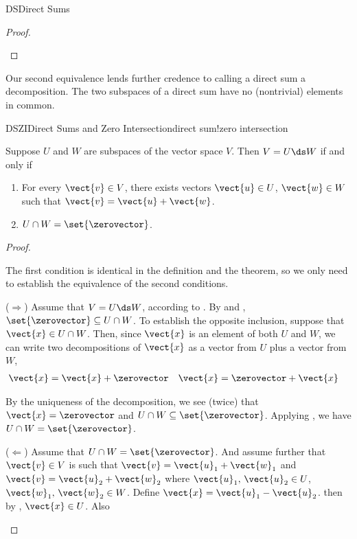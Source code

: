 \begin{subsect}{DS}{Direct Sums}
\begin{proof}
\begin{para}
\end{para}
%
\end{proof}
%
\begin{para}Our second equivalence lends further credence to calling a direct sum a decomposition.  The two subspaces of a direct sum have no (nontrivial) elements in common.\end{para}
%
\begin{theorem}{DSZI}{Direct Sums and Zero Intersection}{direct sum!zero intersection}
\begin{para}Suppose $U$ and $W$ are subspaces of the vector space $V$.  Then $V=U\ds W$ if and only if
\begin{enumerate}
\item  For every $\vect{v}\in V$, there exists vectors $\vect{u}\in U$, $\vect{w}\in W$ such that $\vect{v}=\vect{u}+\vect{w}$.
%
\item $U\cap W=\set{\zerovector}$.
\end{enumerate}
\end{para}
\end{theorem}
%
\begin{proof}
\begin{para}The first condition is identical in the definition and the theorem, so we only need to establish the equivalence of the second conditions.\end{para}
%
\begin{para}($\Rightarrow$)
Assume that $V=U\ds W$, according to .   By  and , $\set{\zerovector}\subseteq U\cap W$.  To establish the opposite inclusion, suppose that $\vect{x}\in U\cap W$.  Then, since $\vect{x}$ is an element of both $U$ and $W$, we can write two decompositions of $\vect{x}$ as a vector from $U$ plus a vector from $W$,
%
\begin{align*}
\vect{x}&=\vect{x}+\zerovector
&
\vect{x}&=\zerovector+\vect{x}
\end{align*}
\end{para}
%
\begin{para}
By the uniqueness of the decomposition, we see (twice) that $\vect{x}=\zerovector$ and $U\cap W\subseteq\set{\zerovector}$.  Applying , we have $U\cap W=\set{\zerovector}$.\end{para}
%
\begin{para}($\Leftarrow$)
Assume that $U\cap W=\set{\zerovector}$.  And assume further that $\vect{v}\in V$ is such that  $\vect{v}=\vect{u}_1+\vect{w}_1$ and $\vect{v}=\vect{u}_2+\vect{w}_2$ where $\vect{u}_1,\,\vect{u}_2\in U$, $\vect{w}_1,\,\vect{w}_2\in W$.  Define $\vect{x}=\vect{u}_1-\vect{u}_2$.  then by , $\vect{x}\in U$.  Also

\end{para}
\end{proof}
\end{subsect}

